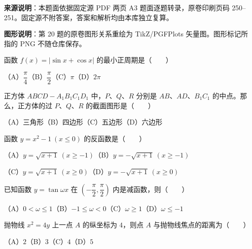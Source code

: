 


\begin{gktip}
\textbf{来源说明}：本题面依据固定源 PDF 两页 A3 题面逐题转录，原卷印刷页码 250–251。固定源不附答案，答案和解析均由本库独立复算。

\textbf{图形说明}：第 20 题的原卷图形关系重绘为 TikZ/PGFPlots 矢量图。图形标记所指的 PNG 不随仓库保存。
\end{gktip}


\begin{question}
函数 $f(x)=|\sin x+\cos x|$ 的最小正周期是\mbox{（　　）}

（A）$\dfrac{\pi}{4}$\quad（B）$\dfrac{\pi}{2}$\quad（C）$\pi$\quad（D）$2\pi$

\end{question}
\begin{question}
正方体 $ABCD-A_1B_1C_1D_1$ 中，$P\text{、}Q\text{、}R$ 分别是 $AB\text{、}AD\text{、}B_1C_1$ 的中点。那么，正方体的过 $P\text{、}Q\text{、}R$ 的截面图形是\mbox{（　　）}

（A）三角形\quad（B）四边形\quad（C）五边形\quad（D）六边形

\end{question}
\begin{question}
函数 $y=x^2-1\ (x\leqslant0)$ 的反函数是\mbox{（　　）}

（A）$y=\sqrt{x+1}\ (x\geqslant-1)$\quad（B）$y=-\sqrt{x+1}\ (x\geqslant-1)$

（C）$y=\sqrt{x+1}\ (x\geqslant0)$\quad（D）$y=-\sqrt{x+1}\ (x\geqslant0)$

\end{question}
\begin{question}
已知函数 $y=\tan\omega x$ 在 $\left(-\dfrac{\pi}{2},\dfrac{\pi}{2}\right)$ 内是减函数，则\mbox{（　　）}

（A）$0<\omega\leqslant1$\quad（B）$-1\leqslant\omega<0$\quad（C）$\omega\geqslant1$\quad（D）$\omega\leqslant-1$

\end{question}
\begin{question}
抛物线 $x^2=4y$ 上一点 $A$ 的纵坐标为 $4$，则点 $A$ 与抛物线焦点的距离为\mbox{（　　）}

（A）$2$\quad（B）$3$\quad（C）$4$\quad（D）$5$

\end{question}
